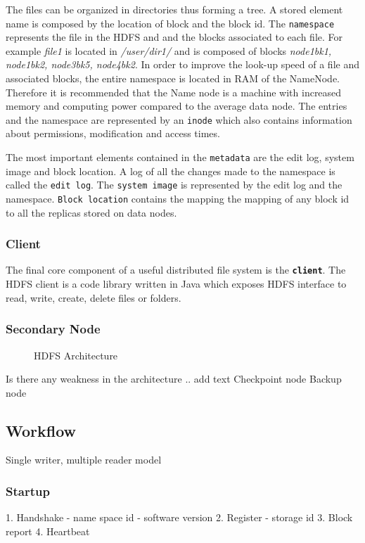 \documentclass{sig-alternate}
\begin{document}
The files can be organized in directories thus forming a tree. A stored element name is composed by the location of block and the block id.
The \texttt{namespace} represents the file in the HDFS and and the blocks associated to each file. For example \textit{file1} is located in \textit{/user/dir1/} and is composed of blocks \textit{node1bk1, node1bk2, node3bk5, node4bk2}.
In order to improve the look-up speed of a file and associated blocks, the entire namespace is located in RAM of the NameNode. Therefore it is recommended that the Name node is a machine with increased memory and computing power compared to the average data node.
The entries and the namespace are represented by an \texttt{inode} which also contains information about permissions, modification and access times.

The most important elements contained in the \texttt{metadata} are the edit log, system image and block location.
A log of all the changes made to the namespace is called the \texttt{edit log}. The \texttt{system image} is represented by the edit log and the namespace. \texttt{Block location} contains the mapping the mapping of any block id to all the replicas stored on data nodes.

\subsubsection{Client}
The final core component of a useful distributed file system is the \textbf{\texttt{client}}.
The HDFS client is a code library written in Java which 
exposes HDFS interface to
read, write, create, delete files or folders. 


\subsubsection{Secondary Node}
\begin{figure}[!hbt]
\centering
{}
\caption{HDFS Architecture}
\label{fig:hdfs_architecture}
\end{figure}

Is there any weakness in the architecture
.. add text
Checkpoint node
Backup node

\subsection{Workflow}
Single writer, multiple reader model

\subsubsection{Startup}
1. Handshake
- name space id
- software version
2. Register
- storage id
3. Block report
4. Heartbeat
\end{document}
